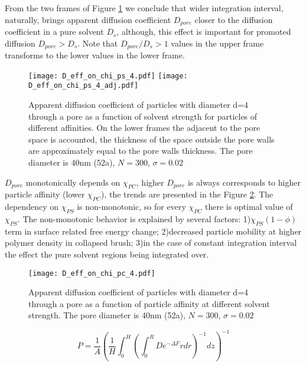 \documentclass[12pt,a4paper]{article}
\begin{document}
From the two frames of Figure \ref{fig: D_eff_on_chi_ps} we conclude that wider integration interval, naturally, brings apparent diffusion coefficient  $D_{pore}$ closer to the diffusion coefficient in a pure solvent $D_s$, although, this effect is important for promoted diffusion $D_{pore} > D_s$.
Note that $D_{pore}/D_s > 1$ values in the upper frame transforms to the lower values in the lower frame.


\begin{figure}
    \texttt{[image: D\_eff\_on\_chi\_ps\_4.pdf]}
    \texttt{[image: D\_eff\_on\_chi\_ps\_4\_adj.pdf]}
    \caption[]{Apparent diffusion coefficient of particles with diameter d=4 through a pore as a function of solvent strength for particles of different affinities. 
    On the lower frames the adjacent to the pore space is accounted, the thickness of the space outside the pore walls are approximately equal to the pore walls thickness.
    The pore diameter is 40nm (52a), $N=300$, $\sigma=0.02$
    }
    \label{fig: D_eff_on_chi_ps}
\end{figure}

$D_{pore}$ monotonically depends on $\chi_{PC}$, higher $D_{pore}$ is always corresponds to higher particle affinity (lower $\chi_{PC}$), the trends are presented in the Figure \ref{fig: D_eff_on_chi_pc}.
The dependency on $\chi_{PS}$ is non-monotonic, so for every $\chi_{PC}$ there is optimal value of $\chi_{PS}$. 
The non-monotonic behavior is explained by several factors: 
1)$\chi_{PS}(1-\phi)$ term in surface related free energy change; 
2)decreased particle mobility at higher polymer density in collapsed brush; 
3)in the case of constant integration interval the effect the pure solvent regions being integrated over.

\begin{figure}
    \texttt{[image: D\_eff\_on\_chi\_pc\_4.pdf]}
    \caption[]{Apparent diffusion coefficient of particles with diameter d=4 through a pore as a function of particle affinity at different solvent strength. 
    The pore diameter is 40nm (52a), $N=300$, $\sigma=0.02$
    }
    \label{fig: D_eff_on_chi_pc}
\end{figure}



\begin{equation}
    P = \frac{1}{A} \left( \frac{1}{H} \int^{H}_{0} \left( \int^{R}_{0} D e^{-\Delta F} r dr \right)^{-1} dz \right)^{-1}
\end{equation}
\end{document}
